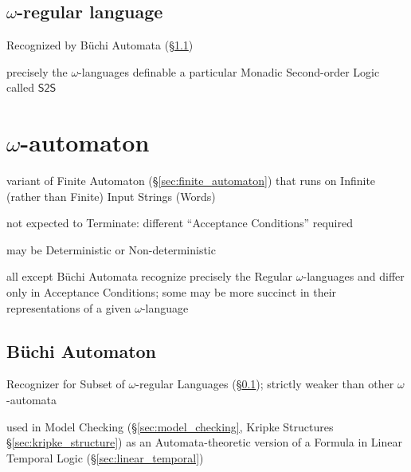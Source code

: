 \subsection{$\omega$-regular language}\label{sec:omega_regular}

Recognized by B\"uchi Automata (\S\ref{sec:buchi_automaton})

precisely the $\omega$-languages definable a particular Monadic
Second-order Logic called $\mathsf{S2S}$



\section{$\omega$-automaton}\label{sec:omega_automaton}

variant of Finite Automaton (\S\ref{sec:finite_automaton}) that runs
on Infinite (rather than Finite) Input Strings (Words)

not expected to Terminate: different ``Acceptance Conditions''
required %

may be Deterministic or Non-deterministic

all except B\"uchi Automata recognize precisely the Regular
$\omega$-languages and differ only in Acceptance Conditions; some may
be more succinct in their representations of a given $\omega$-language



\subsection{B\"uchi Automaton}\label{sec:buchi_automaton}

Recognizer for Subset of $\omega$-regular Languages
(\S\ref{sec:omega_regular}); strictly weaker than other
$\omega$-automata

used in Model Checking (\S\ref{sec:model_checking}, Kripke Structures
\S\ref{sec:kripke_structure}) as an Automata-theoretic version of a
Formula in Linear Temporal Logic (\S\ref{sec:linear_temporal})



